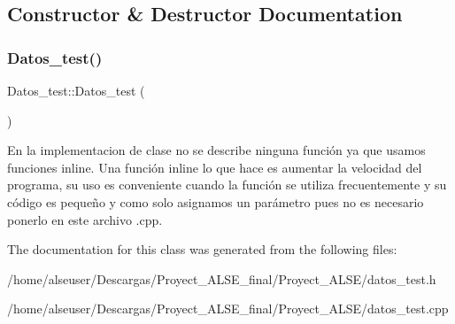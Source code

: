 \subsection{Constructor \& Destructor Documentation}
\mbox{\label{class_datos__test_a518fe33b48dbc4295caae0e31a898eac}} 
\subsubsection{\texorpdfstring{Datos\+\_\+test()}{Datos\_test()}}
{\footnotesize\ttfamily Datos\+\_\+test\+::\+Datos\+\_\+test (\begin{DoxyParamCaption}{ }\end{DoxyParamCaption})}

En la implementacion de clase no se describe ninguna función ya que usamos funciones inline. Una función inline lo que hace es aumentar la velocidad del programa, su uso es conveniente cuando la función se utiliza frecuentemente y su código es pequeño y como solo asignamos un parámetro pues no es necesario ponerlo en este archivo .cpp. 

The documentation for this class was generated from the following files\+:\begin{DoxyCompactItemize}
\item 
/home/alseuser/\+Descargas/\+Proyect\+\_\+\+A\+L\+S\+E\+\_\+final/\+Proyect\+\_\+\+A\+L\+S\+E/datos\+\_\+test.\+h\item 
/home/alseuser/\+Descargas/\+Proyect\+\_\+\+A\+L\+S\+E\+\_\+final/\+Proyect\+\_\+\+A\+L\+S\+E/datos\+\_\+test.\+cpp\end{DoxyCompactItemize}

